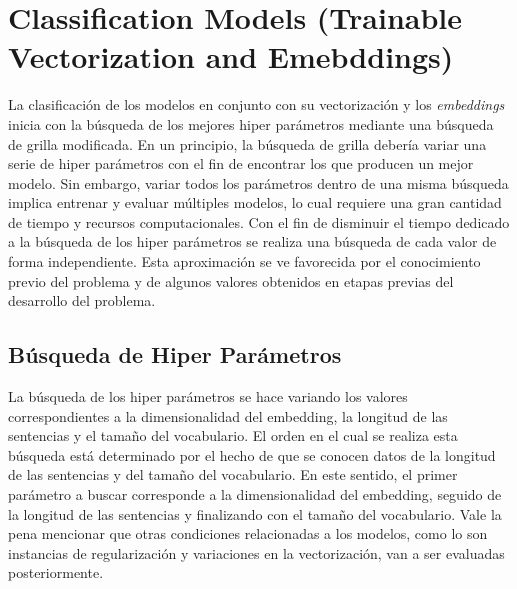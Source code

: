 \newpage
\section{Classification Models (Trainable Vectorization and Emebddings)}
La clasificación de los modelos en conjunto con su vectorización y los \textit{embeddings} inicia con la búsqueda de los mejores hiper parámetros mediante una búsqueda de grilla modificada. En un principio, la búsqueda de grilla debería variar una serie de hiper parámetros con el fin de encontrar los que producen un mejor modelo. Sin embargo, variar todos los parámetros dentro de una misma búsqueda implica entrenar y evaluar múltiples modelos, lo cual requiere una gran cantidad de tiempo y recursos computacionales. Con el fin de disminuir el tiempo dedicado a la búsqueda de los hiper parámetros se realiza una búsqueda de cada valor de forma independiente. Esta aproximación se ve favorecida por el conocimiento previo del problema y de algunos valores obtenidos en etapas previas del desarrollo del problema. \\

\subsection{Búsqueda de Hiper Parámetros}

La búsqueda de los hiper parámetros se hace variando los valores correspondientes a la dimensionalidad del embedding, la longitud de las sentencias y el tamaño del vocabulario. El orden en el cual se realiza esta búsqueda está determinado por el hecho de que se conocen datos de la longitud de las sentencias y del tamaño del vocabulario. En este sentido, el primer parámetro a buscar corresponde a la dimensionalidad del embedding, seguido de la longitud de las sentencias y finalizando con el tamaño del vocabulario. Vale la pena mencionar que otras condiciones relacionadas a los modelos, como lo son instancias de regularización y variaciones en la vectorización, van a ser evaluadas posteriormente. \\

